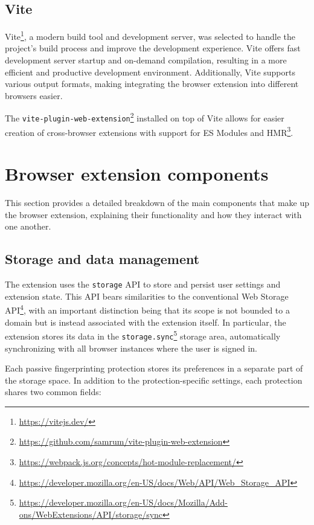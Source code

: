 \subsection{Vite}

Vite\footnote{\url{https://vitejs.dev/}}, a modern build tool and development server, was selected to handle the project's build process and improve the development experience. Vite offers fast development server startup and on-demand compilation, resulting in a more efficient and productive development environment. Additionally, Vite supports various output formats, making integrating the browser extension into different browsers easier. 
	
The \texttt{vite-plugin-web-extension}\footnote{\url{https://github.com/samrum/vite-plugin-web-extension}} installed on top of Vite allows for easier creation of cross-browser extensions with support for ES Modules and HMR\footnote{\url{https://webpack.js.org/concepts/hot-module-replacement/}}.

\section{Browser extension components}
\label{Section:Components}

This section provides a detailed breakdown of the main components that make up the browser extension, explaining their functionality and how they interact with one another.

\subsection{Storage and data management}

The extension uses the \texttt{storage} API to store and persist user settings and extension state. This API bears similarities to the conventional Web Storage API\footnote{\url{https://developer.mozilla.org/en-US/docs/Web/API/Web_Storage_API}}, with an important distinction being that its scope is not bounded to a domain but is instead associated with the extension itself. In particular, the extension stores its data in the \texttt{storage.sync}\footnote{\url{https://developer.mozilla.org/en-US/docs/Mozilla/Add-ons/WebExtensions/API/storage/sync}} storage area, automatically synchronizing with all browser instances where the user is signed in.

Each passive fingerprinting protection stores its preferences in a separate part of the storage space. In addition to the protection-specific settings, each protection shares two common fields:

